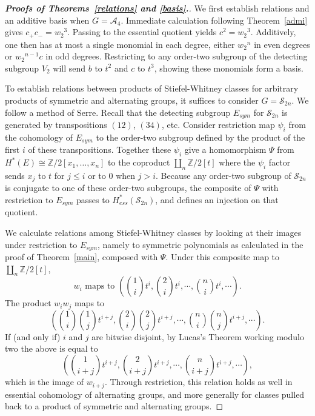 \documentclass{article}
\theoremstyle{plain}
\theoremstyle{definition}
\newcommand{\Z}{\mathbb{Z}}
\newcommand{\si}{\mathcal{S}}
\newcommand{\alt}{\mathcal{A}}
\begin{document}
\begin{proof}[{\bf Proofs of Theorems~\ref{relations} and \ref{basis}.}]

We first establish relations and an additive basis when $G = \alt_4$.
  Immediate calculation following Theorem~\ref{admi} gives
$c_+ c_- = {w_2}^3$. Passing to the essential quotient yields
$c^2 = {w_2}^3$. Additively, one then has at most a single
monomial in each degree, either ${w_2}^n$ in even degrees or ${w_2}^{n-1} c$ in odd degrees.  Restricting to any order-two 
subgroup of the detecting subgroup $V_2$ will send $b$ to $t^2$
and $c$ to $t^3$, showing these monomials form a basis. 

To establish relations between products of Stiefel-Whitney classes 
for arbitrary products of symmetric and alternating groups,
it suffices to consider $G= \si_{2n}$.  We follow a method of Serre.
Recall that the detecting subgroup $E_{sym}$ for $\si_{2n}$ is generated
by transpositions $(12)$, $(34)$, etc.
Consider restriction map $\psi_i$ from
the cohomology of $E_{sym}$ to the order-two subgroup
defined by the product of the first $i$ of these transpositions. Together these $\psi_i$ give a homomorphism $\Psi$ from 
$H^*(E ) \cong \Z/2[x_1, \ldots, x_n]$ to the coproduct $\coprod_n \Z/2[t]$ where the $\psi_i$ factor sends $x_j$ to $t$ for $j \le i$ or to $0$ when $j > i$.  Because any order-two subgroup
of $\si_{2n}$ is conjugate to one of these order-two subgroups,
the composite of $\Psi$ with restriction to $E_{sym}$ passes to 
$H^*_{ess}(\si_{2n} )$, and defines
an injection on that quotient.

We  calculate relations among  Stiefel-Whitney classes by looking at their images under restriction to $E_{sym}$, namely to symmetric
polynomials as calculated in the proof of Theorem~\ref{main},
composed with $\Psi$.   
Under this composite map to $\coprod_n  \Z/2[t]$, 
    \[ w_i  \text{ maps to }\left(\binom{1}{i} t^i, \binom{2}{i} t^i, \cdots, \binom{n}{i} t^i, \cdots \right). \]
 The product $w_iw_j$ maps to 
    \[  \left(\binom{1}{i}\binom{1}{j} t^{i+j}, \binom{2}{i}\binom{2}{j} t^{i+j}, \cdots, \binom{n}{i}\binom{n}{j} t^{i+j}, \cdots \right).\]
    If (and only if) $i$ and $j$ are bitwise disjoint,  by Lucas's Theorem working modulo two the above is equal to 
    \[ \left(\binom{1}{i+j} t^{i+j}, \binom{2}{i+j} t^{i+j}, \cdots, \binom{n}{i+j} t^{i+j}, \cdots \right),\]
    which is  the image of $w_{i+j}$.
Through restriction, this relation holds as well in essential cohomology
of alternating groups, and more generally for classes pulled back
to a product of symmetric and alternating groups.



\end{proof}
\end{document}
